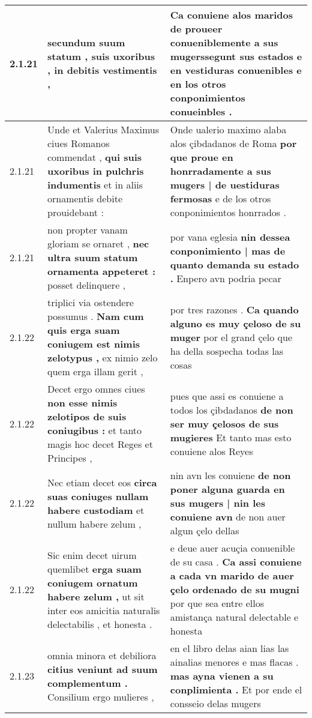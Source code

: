 \begin{tabular}{|p{1cm}|p{6.5cm}|p{6.5cm}|}
2.1.21 & secundum suum statum , \textbf{ suis uxoribus , } in debitis vestimentis , & Ca conuiene alos maridos de proueer conueniblemente a sus \textbf{ mugerssegunt sus estados e en vestiduras conuenibles } e en los otros conponimientos conueinbles . \\\hline
2.1.21 & Unde et Valerius Maximus ciues Romanos commendat , \textbf{ qui suis uxoribus in pulchris indumentis } et in aliis ornamentis debite prouidebant : & Onde ualerio maximo alaba alos çibdadanos de Roma \textbf{ por que proue en honrradamente a sus mugers | de uestiduras fermosas } e de los otros conponimientos honrrados . \\\hline
2.1.21 & non propter vanam gloriam se ornaret , \textbf{ nec ultra suum statum ornamenta appeteret : } posset delinquere , & por vana eglesia \textbf{ nin dessea conponimiento | mas de quanto demanda su estado . } Enpero avn podria pecar \\\hline
2.1.22 & triplici via ostendere possumus . \textbf{ Nam cum quis erga suam coniugem est nimis zelotypus , } ex nimio zelo quem erga illam gerit , & por tres razones . \textbf{ Ca quando alguno es muy çeloso de su muger } por el grand çelo que ha della sospecha todas las cosas \\\hline
2.1.22 & Decet ergo omnes ciues \textbf{ non esse nimis zelotipos de suis coniugibus : } et tanto magis hoc decet Reges et Principes , & pues que assi es conuiene a todos los çibdadanos \textbf{ de non ser muy çelosos de sus mugieres } Et tanto mas esto conuiene alos Reyes \\\hline
2.1.22 & Nec etiam decet eos \textbf{ circa suas coniuges nullam habere custodiam } et nullum habere zelum , & nin avn les conuiene \textbf{ de non poner alguna guarda en sus mugers | nin les conuiene avn } de non auer algun çelo dellas \\\hline
2.1.22 & Sic enim decet uirum quemlibet \textbf{ erga suam coniugem ornatum habere zelum , } ut sit inter eos amicitia naturalis delectabilis , et honesta . & e deue auer acuçia conuenible de su casa . \textbf{ Ca assi conuiene a cada vn marido de auer çelo ordenado de su mugni } por que sea entre ellos amistança natural delectable e honesta \\\hline
2.1.23 & omnia minora et debiliora \textbf{ citius veniunt ad suum complementum . } Consilium ergo mulieres , & en el libro delas aian lias las ainalias menores e mas flacas . \textbf{ mas ayna vienen a su conplimienta . } Et por ende el consseio delas mugers \\\hline

\end{tabular}
